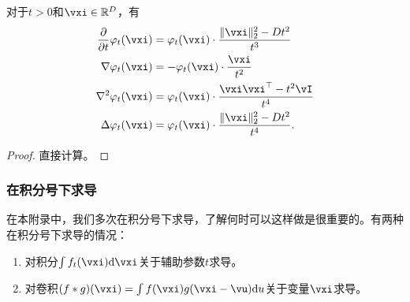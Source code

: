 \documentclass[../../book-main_zh.tex]{subfiles}
\begin{document}
\begin{proposition}\label{prop:normal_derivatives}
    对于\(t > 0\)和\(\vxi \in \R^{D}\)，有
    \begin{align}
        \pdv*{\phi_{t}}{t}(\vxi)
        &= \phi_{t}(\vxi) \cdot \frac{\norm{\vxi}_{2}^{2} - Dt^{2}}{t^{3}} \\
        \nabla \phi_{t}(\vxi)
        &= -\phi_{t}(\vxi)\cdot\frac{\vxi}{t^{2}} \\ 
        \nabla^{2} \phi_{t}(\vxi)
        &= \phi_{t}(\vxi)\cdot\frac{\vxi\vxi^{\top} - t^{2}\vI}{t^{4}} \\
        \Delta \phi_{t}(\vxi)
        &= \phi_{t}(\vxi) \cdot \frac{\norm{\vxi}_{2}^{2} - Dt^{2}}{t^{4}}.
    \end{align}
\end{proposition}
\begin{proof}
    直接计算。
\end{proof}



\subsubsection{在积分号下求导}

在本附录中，我们多次在积分号下求导，了解何时可以这样做是很重要的。有两种在积分号下求导的情况：
\begin{enumerate}
    \item 对积分\(\int f_{t}(\vxi)\odif{\vxi}\)关于辅助参数\(t\)求导。
    \item 对卷积\((f * g)(\vxi) = \int f(\vxi)g(\vxi - \vu)\odif{u}\)关于变量\(\vxi\)求导。
\end{enumerate}
\end{document}
